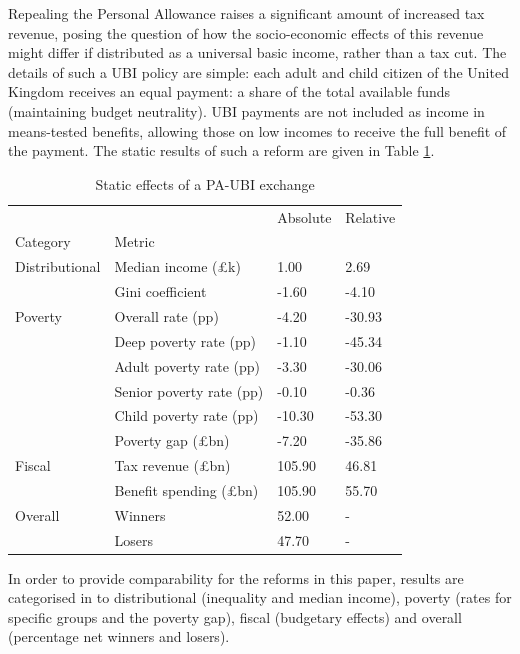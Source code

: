 \documentclass{article}
\begin{document}
    Repealing the Personal Allowance raises a significant amount of increased tax revenue, posing the question of how the socio-economic effects of this revenue might differ if distributed as a universal basic income, rather than a tax cut. The details of such a UBI policy are simple: each adult and child citizen of the United Kingdom receives an equal payment: a share of the total available funds (maintaining budget neutrality). UBI payments are not included as income in means-tested benefits, allowing those on low incomes to receive the full benefit of the payment. The static results of such a reform are given in Table \ref{tab:PA_UBI_results}.
    \begin{table}
        \centering
        \begin{tabular}{llll}
            \toprule
                    &        & Absolute & Relative \\
            Category & Metric &          &          \\
            \midrule
            Distributional & Median income (£k) &     1.00 &     2.69 \\
                    & Gini coefficient &    -1.60 &    -4.10 \\
            Poverty & Overall rate (pp) &    -4.20 &   -30.93 \\
                    & Deep poverty rate (pp) &    -1.10 &   -45.34 \\
                    & Adult poverty rate (pp) &    -3.30 &   -30.06 \\
                    & Senior poverty rate (pp) &    -0.10 &    -0.36 \\
                    & Child poverty rate (pp) &   -10.30 &   -53.30 \\
                    & Poverty gap (£bn) &    -7.20 &   -35.86 \\
            Fiscal & Tax revenue (£bn) &   105.90 &    46.81 \\
                    & Benefit spending (£bn) &   105.90 &    55.70 \\
            Overall & Winners &    52.00 &        - \\
                    & Losers &    47.70 &        - \\
            \bottomrule
            \end{tabular}
        \caption{Static effects of a PA-UBI exchange}
        \label{tab:PA_UBI_results}
    \end{table}
    
    In order to provide comparability for the reforms in this paper, results are categorised in to distributional (inequality and median income), poverty (rates for specific groups and the poverty gap), fiscal (budgetary effects) and overall (percentage net winners and losers). 
    
\end{document}
